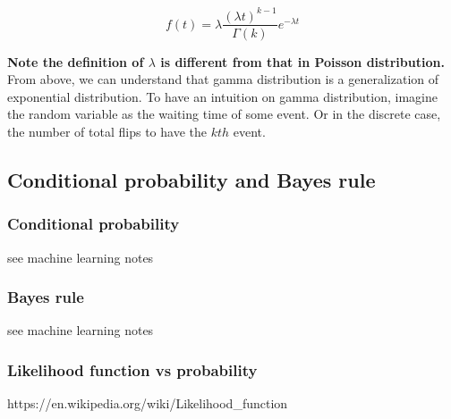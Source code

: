 \documentclass[11pt]{article}
\begin{document}
\[f(t) = \lambda \frac{(\lambda t)^{k-1}}{\Gamma(k)}e^{-\lambda t}\]

\textbf{Note the definition of \(\lambda\) is different from that in
Poisson distribution.} From above, we can understand that gamma
distribution is a generalization of exponential distribution. To have an
intuition on gamma distribution, imagine the random variable as the
waiting time of some event. Or in the discrete case, the number of total
flips to have the \(kth\) event.

    \subsection{Conditional probability and Bayes
rule}\label{conditional-probability-and-bayes-rule}

\subsubsection{Conditional probability}\label{conditional-probability}

see machine learning notes

\subsubsection{Bayes rule}\label{bayes-rule}

see machine learning notes

\subsubsection{Likelihood function vs
probability}\label{likelihood-function-vs-probability}

https://en.wikipedia.org/wiki/Likelihood\_function
\end{document}

